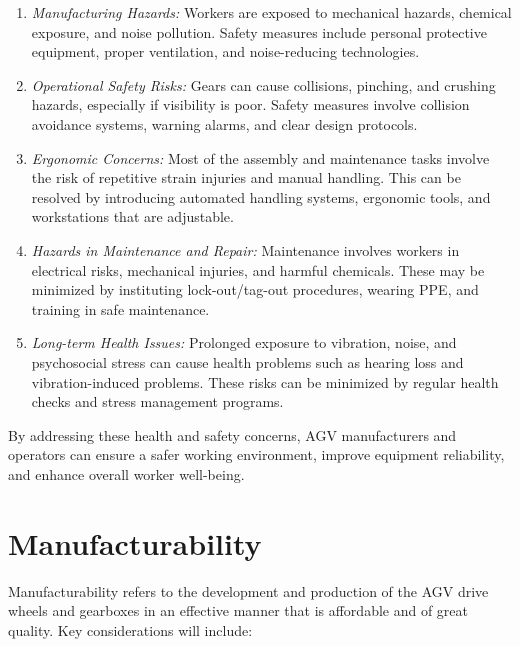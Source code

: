 \documentclass[../../main]{subfiles}
\begin{document}
\begin{enumerate}
    \item \textit{Manufacturing Hazards:} Workers are exposed to mechanical hazards, chemical exposure, and noise pollution. Safety measures include personal protective equipment, proper ventilation, and noise-reducing technologies.
    
    \item \textit{Operational Safety Risks:} Gears can cause collisions, pinching, and crushing hazards, especially if visibility is poor. Safety measures involve collision avoidance systems, warning alarms, and clear design protocols.
    
    \item \textit{Ergonomic Concerns:} Most of the assembly and maintenance tasks involve the risk of repetitive strain injuries and manual handling. This can be resolved by introducing automated handling systems, ergonomic tools, and workstations that are adjustable.
    
    \item \textit{Hazards in Maintenance and Repair:} Maintenance involves workers in electrical risks, mechanical injuries, and harmful chemicals. These may be minimized by instituting lock-out/tag-out procedures, wearing PPE, and training in safe maintenance.
    
    \item \textit{Long-term Health Issues:} Prolonged exposure to vibration, noise, and psychosocial stress can cause health problems such as hearing loss and vibration-induced problems. These risks can be minimized by regular health checks and stress management programs.
\end{enumerate}

By addressing these health and safety concerns, AGV manufacturers and operators can ensure a safer working environment, improve equipment reliability, and enhance overall worker well-being.
\section{Manufacturability}

Manufacturability refers to the development and production of the AGV drive wheels and gearboxes in an effective manner that is affordable and of great quality. Key considerations will include:
\end{document}
